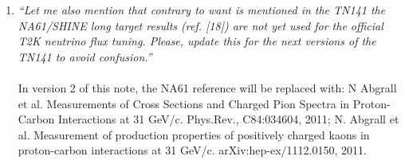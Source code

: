 \begin{enumerate}
\vspace{5 mm}
\item
{\em
   ``Let me also mention that contrary to want is mentioned in the TN141 the NA61/SHINE long target results 
   (ref. [18]) are not yet used for the official T2K neutrino flux tuning. 
   Please, update this for the next versions of the TN141 to avoid confusion.''
}\\
\\
In version 2 of this note, the NA61 reference will be replaced with:
N Abgrall et al. Measurements of Cross Sections and Charged Pion Spectra in Proton-Carbon Interactions 
at 31 GeV/c. Phys.Rev., C84:034604, 2011; 
N. Abgrall et al. Measurement of production properties of positively charged kaons in proton-carbon 
interactions at 31 GeV/c. arXiv:hep-ex/1112.0150, 2011.

\end{enumerate}
